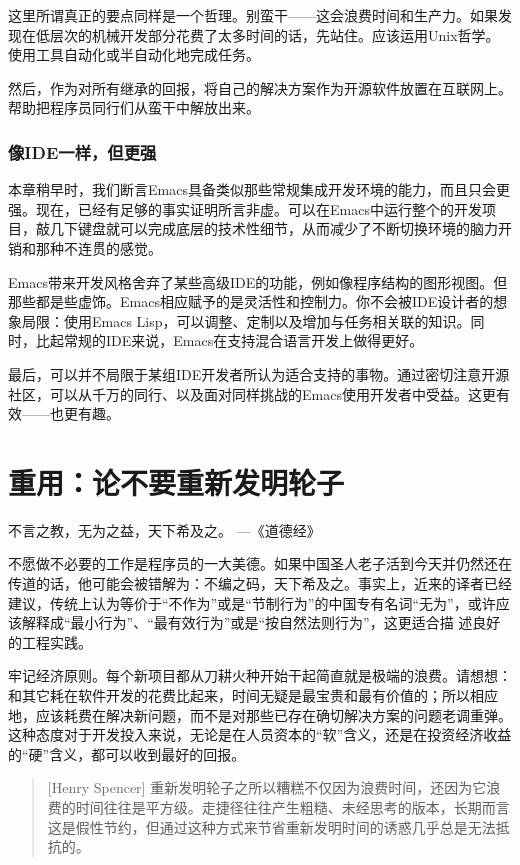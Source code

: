 \documentclass[12pt,oneside]{book}
\begin{document}
这里所谓真正的要点同样是一个哲理。别蛮干——这会浪费时间和生产力。如果发现在低层次的机械开发部分花费了太多时间的话，先站住。应该运用Unix哲学。使用工具自动化或半自动化地完成任务。

然后，作为对所有继承的回报，将自己的解决方案作为开源软件放置在互联网上。帮助把程序员同行们从蛮干中解放出来。


\subsection{像IDE一样，但更强}
本章稍早时，我们断言Emacs具备类似那些常规集成开发环境的能力，而且只会更强。现在，已经有足够的事实证明所言非虚。可以在Emacs中运行整个的开发项目，敲几下键盘就可以完成底层的技术性细节，从而减少了不断切换环境的脑力开销和那种不连贯的感觉。

Emacs带来开发风格舍弃了某些高级IDE的功能，例如像程序结构的图形视图。但那些都是些虚饰。Emacs相应赋予的是灵活性和控制力。你不会被IDE设计者的想象局限：使用Emacs Lisp，可以调整、定制以及增加与任务相关联的知识。同时，比起常规的IDE来说，Emacs在支持混合语言开发上做得更好。

最后，可以并不局限于某组IDE开发者所认为适合支持的事物。通过密切注意开源社区，可以从千万的同行、以及面对同样挑战的Emacs使用开发者中受益。这更有效——也更有趣。




\chapter{重用：论不要重新发明轮子}
\begin{flushright}
不言之教，无为之益，天下希及之。
{\hfill —《道德经》}
\end{flushright}

不愿做不必要的工作是程序员的一大美德。如果中国圣人老子活到今天并仍然还在传道的话，他可能会被错解为：不编之码，天下希及之。事实上，近来的译者已经建议，传统上认为等价于“不作为”或是“节制行为”的中国专有名词“无为”，或许应该解释成“最小行为”、“最有效行为”或是“按自然法则行为”，这更适合描
述良好的工程实践。

牢记经济原则。每个新项目都从刀耕火种开始干起简直就是极端的浪费。请想想：和其它耗在软件开发的花费比起来，时间无疑是最宝贵和最有价值的；所以相应地，应该耗费在解决新问题，而不是对那些已存在确切解决方案的问题老调重弹。这种态度对于开发投入来说，无论是在人员资本的“软”含义，还是在投资经济收益的“硬”含义，都可以收到最好的回报。

\begin{quote}[Henry Spencer]
重新发明轮子之所以糟糕不仅因为浪费时间，还因为它浪费的时间往往是平方级。走捷径往往产生粗糙、未经思考的版本，长期而言这是假性节约，但通过这种方式来节省重新发明时间的诱惑几乎总是无法抵抗的。
\end{quote}
\end{document}
